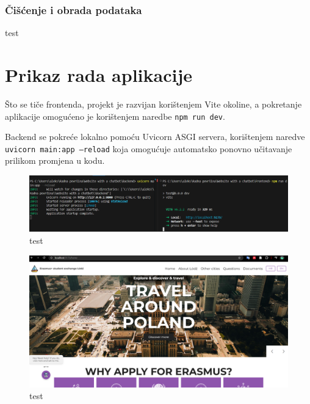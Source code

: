 \documentclass[]{foi}
\begin{document}
\subsubsection{Čišćenje i obrada podataka}
test





\section{Prikaz rada aplikacije}

Što se tiče frontenda, projekt je razvijan korištenjem Vite okoline, a pokretanje aplikacije omogućeno je korištenjem naredbe \texttt{npm run dev}.

Backend se pokreće lokalno pomoću Uvicorn ASGI servera, korištenjem naredve \texttt{uvicorn main:app --reload} koja omogućuje automatsko
ponovno učitavanje prilikom promjena u kodu.

\begin{figure}[ht]
  \centering
  \includegraphics[width=1\textwidth]{./assets/pokretanje.png}
  \caption{test}
  \label{fig:slika93}
\end{figure}

\begin{figure}[ht]
  \centering
  \includegraphics[width=1\textwidth]{./assets/Home.png}
  \caption{test}
  \label{fig:slika94}
\end{figure}
\end{document}
